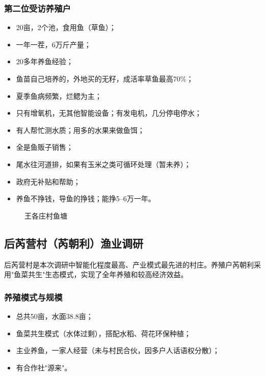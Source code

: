 \documentclass[12pt,a4paper]{article}
\begin{document}
\subsubsection{第二位受访养殖户}

\begin{itemize}[leftmargin=2em]
    \item 20亩，2个池，食用鱼（草鱼）；
    \item 一年一茬，6万斤产量；
    \item 20多年养鱼经验；
    \item 鱼苗自己培养的，外地买的无籽，成活率草鱼最高70\%；
    \item 夏季鱼病频繁，烂鳃为主；
    \item 只有增氧机，无其他智能设备；有发电机，几分停电停水；
    \item 有人帮忙测水质；用多的水果来做鱼饵；
    \item 全是鱼贩子销售；
    \item 尾水往河道排，如果有玉米之类可循环处理（暂未养）；
    \item 政府无补贴和帮助；
    \item 养鱼不挣钱，导鱼的挣钱；能挣5--6万一年。
\end{itemize}

\begin{figure}[H]
\centering
{}
\caption{王各庄村鱼塘}
\end{figure}

\subsection{后芮营村（芮朝利）渔业调研}

后芮营村是本次调研中智能化程度最高、产业模式最先进的村庄。养殖户芮朝利采用"鱼菜共生"生态模式，实现了全年养殖和较高经济效益。

\subsubsection{养殖模式与规模}

\begin{itemize}[leftmargin=2em]
    \item 总共50亩，水面38.8亩；
    \item 鱼菜共生模式（水体过剩），搭配水稻、荷花环保种植；
    \item 主业养鱼，一家人经营（未与村民合伙，因多户人话语权分散）；
    \item 有合作社"源来"。
\end{itemize}
\end{document}
